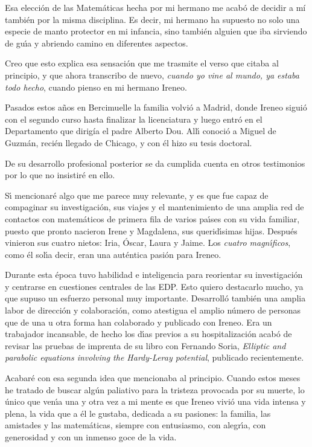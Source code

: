 Esa elecci\'on  de las Matem\'aticas  hecha por mi hermano me acab\'o de decidir a m\'i tambi\'en por la misma disciplina.
Es decir, mi hermano ha supuesto no solo una especie de manto protector en mi infancia, sino tambi\'en alguien que iba sirviendo de gu\'{\i}a y abriendo camino en diferentes aspectos.

Creo que esto explica esa sensaci\'on que me trasmite el verso que citaba al principio, y que ahora transcribo de nuevo, \textit{cuando yo vine al mundo, ya estaba todo hecho}, cuando pienso en mi hermano Ireneo.

Pasados estos a\~nos en Bercimuelle la familia volvi\'o a Madrid, donde Ireneo sigui\'o con el segundo curso hasta finalizar la licenciatura y luego  entr\'o en el Departamento que dirig\'ia el padre Alberto Dou. All\'{\i} conoci\'o a Miguel de Guzm\'an, reci\'en llegado de Chicago, y  con \'el hizo su tesis doctoral.

De su desarrollo profesional posterior se da cumplida cuenta en otros testimonios por lo que no insistir\'e en ello.

S\'{\i} mencionar\'e algo que me parece muy relevante, y es que fue capaz de compaginar su investigaci\'on, sus viajes y el mantenimiento de una amplia red de contactos con matem\'aticos de primera fila de varios pa\'{\i}ses con su vida familiar, puesto que pronto nacieron Irene y Magdalena, sus querid\'{\i}simas hijas. Despu\'es vinieron sus cuatro nietos: Iria, \'Oscar, Laura y Jaime. Los \textit{cuatro magn\'{\i}ficos}, como \'el sol\'{\i}a decir, eran una aut\'entica pasi\'on para Ireneo.

Durante esta \'epoca tuvo  habilidad e inteligencia  para   reorientar su  investigaci\'on y centrarse en cuestiones centrales de las EDP.  Esto quiero destacarlo mucho, ya que supuso un esfuerzo personal muy importante. Desarroll\'o tambi\'en una amplia labor de direcci\'on y colaboraci\'on, como atestigua el amplio n\'umero de personas que de una u otra forma han colaborado y publicado con Ireneo. Era un trabajador incansable, de hecho los d\'{\i}as previos a su hospitalizaci\'on acab\'o de revisar las pruebas de imprenta de su libro con Fernando Soria, \textit{Elliptic and parabolic equations involving the Hardy-Leray potential}, publicado recientemente.
 
Acabar\'e con esa segunda idea que mencionaba al principio. Cuando estos meses he tratado de buscar alg\'un paliativo para la tristeza provocada por su muerte, lo \'unico que ven\'{\i}a una y otra vez a mi mente es que Ireneo vivi\'o una vida intensa  y plena, la vida que a \'el le gustaba,  dedicada a su pasiones: la familia, las amistades y las matem\'aticas, siempre con entusiasmo,  con alegr\'{\i}a, con generosidad  y con un inmenso goce de la vida.

